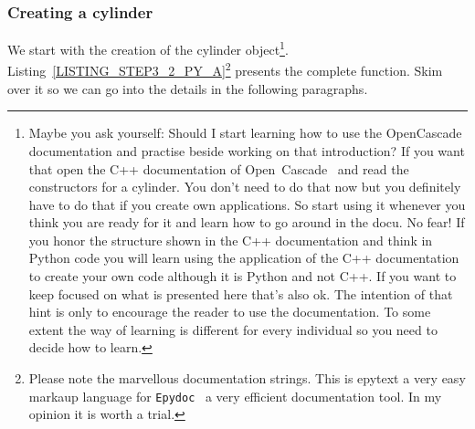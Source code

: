 \subsubsection{Creating a cylinder}
\label{SECT_CYLI}
We start with the creation of the cylinder object\footnote{
Maybe you ask yourself: Should I start learning how to use the OpenCascade documentation and practise beside working on that introduction?
If you want that open the  C++ documentation of Open~Cascade~\cite{OPENCASCADE_ORG} and read the constructors for a cylinder.
You don't need to do that now but you definitely have to do that if you create own applications.
So start using it whenever you think you are ready for it and learn how to go around in the docu. 
No fear! 
If you honor the structure shown in the C++ documentation and think in Python code you will learn using the application of the C++ documentation to create your own code although it is Python and not C++.
If you want to keep focused on what is presented here that's also ok. 
The intention of that hint is only to encourage the reader to use the documentation. 
To some extent the way of learning is different for every individual so you need to decide how to learn.}.
%
Listing~\ref{LISTING_STEP3_2_PY_A}\footnote{Please note the marvellous documentation strings. This is epytext a very easy markaup language for {\tt Epydoc}~\cite{EPYDOCWEB} a very efficient documentation tool. In my opinion it is worth a trial.}
presents the complete function.
Skim over it so we can go into the details in the following paragraphs.
%
